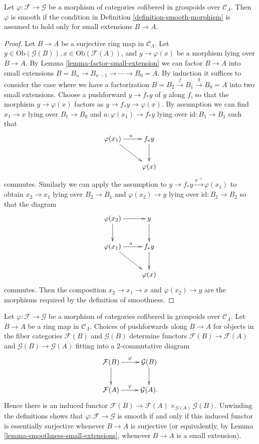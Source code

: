 \begin{lemma}
\label{lemma-smoothness-small-extensions}
Let $\varphi: \mathcal{F} \to \mathcal G$ be a morphism of categories 
cofibered in groupoids over $\mathcal{C}_\Lambda$.  Then $\varphi$ is smooth 
if the condition in Definition \ref{definition-smooth-morphism} is assumed to 
hold only for small extensions $B \to A$.
\end{lemma}

\begin{proof}
Let $B \to A$ be a surjective ring map in $\mathcal{C}_\Lambda$.  Let 
$y \in \text{Ob}(\mathcal G(B)), x \in \text{Ob}(\mathcal{F}(A))$, 
and $y \to \varphi(x)$ be a morphism lying over $B \to A$.  By 
Lemma \ref{lemma-factor-small-extension} we can factor $B \to A$ into 
small extensions $B = B_n \to B_{n-1} \to \cdots \to 
B_0 = A$.  By induction it suffices to consider the case where we have a 
factorization $B = B_2 \xrightarrow{f} B_1 \xrightarrow{g} B_0 = A$ into two 
small extensions.  Choose a pushforward $y \to f_* y$ of $y$ along $f$, 
so that the morphism $y \to \varphi(x)$ factors as $y \to f_* y 
\to \varphi(x)$.  By assumption we can find $x_1 \to x$ lying 
over $B_1 \to B_0$ and $a: \varphi(x_1) \to f_*y$ lying over 
$\text{id}: B_1 \to B_1$ such that
\[
\xymatrix{
\varphi(x_1) \ar[r]^{a} \ar[dr] & f_*y \ar[d] \\
                        & \varphi(x)
}
\]
commutes. Similarly we can apply the assumption to $y \to f_*y 
\xrightarrow{a^{-1}} \varphi(x_1)$ to obtain $x_2 \to x_1$ lying over 
$B_2 \to B_1$ and $\varphi(x_2) \to y$ lying over 
$\text{id}: B_2 \to B_2$ so that the diagram
\[
\xymatrix{
\varphi(x_2) \ar[r] \ar[d] & y \ar[d] \\
\varphi(x_1) \ar[r]^{a} \ar[dr] & f_*y \ar[d] \\
                        & \varphi(x)
}
\] 
commutes. Then the composition $x_2 \to x_1 \to x$ and 
$\varphi(x_2) \to y$ are the morphisms required by the definition of 
smoothness.
\end{proof}

\begin{remark}
\label{remark-smoothness-2-categorical}
Let $\varphi: \mathcal{F} \to \mathcal G$ be a morphism of categories 
cofibered in groupoids over $\mathcal{C}_\Lambda$.  Let $B \to A$ be a 
ring map in $\mathcal{C}_\Lambda$.  Choices of pushforwards along $B 
\to A$ for objects in the fiber categories $\mathcal{F}(B)$ and 
$\mathcal G(B)$ determine functors $\mathcal{F}(B) \to \mathcal{F}(A)$ 
and $\mathcal G(B) \to \mathcal G(A)$ fitting into a $2$-commutative 
diagram
\[
\xymatrix{
\mathcal{F}(B) \ar[r]^{\varphi} \ar[d] & \mathcal G(B) \ar[d] \\
\mathcal{F}(A) \ar[r]^{\varphi}        & \mathcal G(A) .
}
\]
Hence there is an induced functor $\mathcal{F}(B) \to \mathcal{F}(A) 
\times_{\mathcal G(A)} \mathcal G(B)$.  Unwinding the definitions shows that 
$\varphi: \mathcal{F} \to \mathcal G$ is smooth if and only if this 
induced functor is essentially surjective whenever $B \to A$ is 
surjective (or equivalently, by Lemma \ref{lemma-smoothness-small-extensions}, 
whenever $B \to A$ is a small extension).
\end{remark}

